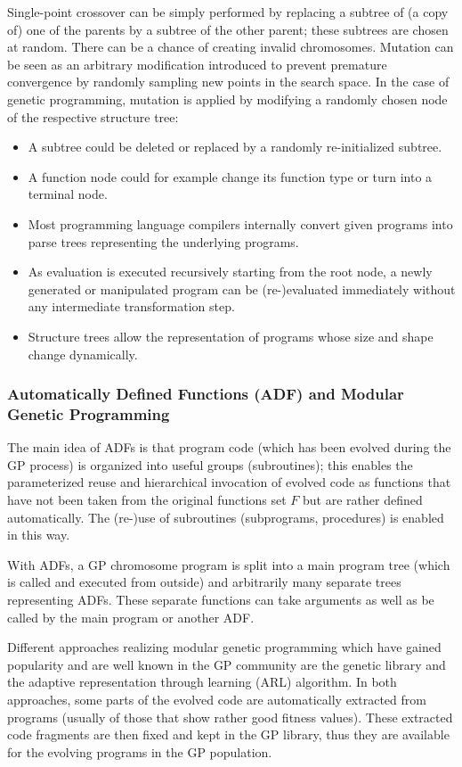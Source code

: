 \documentclass[12pt]{article}
\newcounter{subsubsubsection}[subsubsection]
\begin{document}
Single-point crossover can be simply performed by replacing a subtree of (a copy of) one of the parents by a subtree of the other parent; these subtrees are chosen at random. There can be a chance of creating invalid chromosomes. Mutation can be seen as an arbitrary modification introduced to prevent premature convergence by randomly sampling new points in the search space. In the case of genetic programming, mutation is applied by modifying a randomly chosen node of the respective structure tree:
\begin{itemize}
\item A subtree could be deleted or replaced by a randomly re-initialized subtree.
\item A function node could for example change its function type or turn into a terminal node.
\end{itemize}
\begin{itemize}
\item Most programming language compilers internally convert given programs into parse trees representing the underlying programs.
\item As evaluation is executed recursively starting from the root node, a newly generated or manipulated program can be (re-)evaluated immediately without any intermediate transformation step.
\item Structure trees allow the representation of programs whose size and shape change dynamically.
\end{itemize}
\subsubsection{Automatically Defined Functions (ADF) and Modular Genetic Programming}
The main idea of ADFs is that program code (which has been evolved during the GP process) is organized into useful groups (subroutines); this enables the parameterized reuse and hierarchical invocation of evolved code as functions that have not been taken from the original functions set $F$ but are rather defined automatically. The (re-)use of subroutines (subprograms, procedures) is enabled in this way.

With ADFs, a GP chromosome program is split into a main program tree (which is called and executed from outside) and arbitrarily many separate trees representing ADFs. These separate functions can take arguments as well as be called by the main program or another ADF.

Different approaches realizing modular genetic programming which have gained popularity and are well known in the GP community are the genetic library and the adaptive representation through learning (ARL) algorithm. In both approaches, some parts of the evolved code are automatically extracted from programs (usually of those that show rather good fitness values). These extracted code fragments are then fixed and kept in the GP library, thus they are available for the evolving programs in the GP population.
\end{document}
